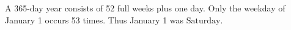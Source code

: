 A 365-day year consists of 52 full weeks plus one day. Only the weekday of January 1 occurs 53 times. Thus January 1 was $\boxed{\text{Saturday}}$.
